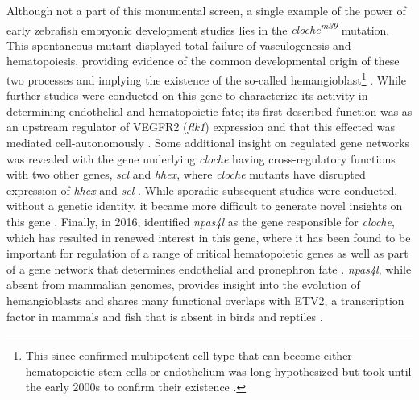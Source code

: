 Although not a part of this monumental screen, a single example of the power of early zebrafish embryonic development studies lies in the \textit{cloche\textsuperscript{m39}} mutation. This spontaneous mutant displayed total failure of vasculogenesis and hematopoiesis, providing evidence of the common developmental origin of these two processes and implying the existence of the so-called hemangioblast\footnote{This since-confirmed multipotent cell type that can become either hematopoietic stem cells or endothelium was long hypothesized \citep{Murray1932, Sabin1920} but took until the early 2000s to confirm their existence \citep{Xiong2008}.} \citep{Stainier1995}. While further studies were conducted on this gene to characterize its activity in determining endothelial and hematopoietic fate; its first described function was as an upstream regulator of VEGFR2 (\textit{flk1}) expression and that this effected was mediated cell-autonomously \citep{Liao1997, Parker1999}. Some additional insight on regulated gene networks was revealed with the gene underlying \textit{cloche} having cross-regulatory functions with two other genes, \textit{scl} and \textit{hhex}, where \textit{cloche} mutants have disrupted expression of \textit{hhex} and \textit{scl} \citep{Liao2000}. While sporadic subsequent studies were conducted, without a genetic identity, it became more difficult to generate novel insights on this gene \citep{Qian2005}. Finally, in 2016, \citeauthor{Reischauer2016} identified \textit{npas4l} as the gene responsible for \textit{cloche}, which has resulted in renewed interest in this gene, where it has been found to be important for regulation of a range of critical hematopoietic genes \citep{Marass2019} as well as part of a gene network that determines endothelial and pronephron fate \citep{Mattonet2022}. \textit{npas4l}, while absent from mammalian genomes, provides insight into the evolution of hemangioblasts and shares many functional overlaps with ETV2, a transcription factor in mammals and fish that is absent in birds and reptiles \citep{Weng2020, Vogeli2006}.


